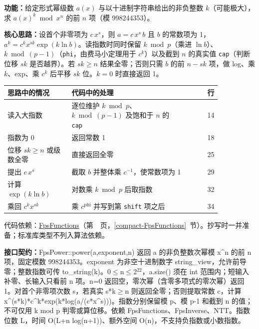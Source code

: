 \noindent\textbf{功能：}\allowbreak 给定形式幂级数 $a(x)$ 与以十进制字符串给出的非负整数 $k$（可能极大），求 $a(x)^k\bmod x^n$ 的前 $n$ 项（模 998244353）。

\textbf{核心思路：}\allowbreak 设首个非零项为 $c\,x^s$，则 $a=c\,x^s\,b$ 且 $b$ 的常数项为 1，$a^k=c^kx^{sk}\exp(k\ln b)$。读指数时同时保留 $k\bmod p$（乘进 $\ln b$）、$k\bmod(p-1)$（\texttt{phi}，由费马小定理用于 $c^k$）以及截到 $n$ 的真实值 \texttt{cap}（判断位移 $sk$ 是否越界）。若 $sk\ge n$ 结果全零；否则只需 $b$ 的前 $n-sk$ 项，做 log、乘 $k$、exp、乘 $c^k$ 后平移 $sk$ 位。$k=0$ 时直接返回 1。

\begin{center}\small
\begin{tabular}{@{}p{0.30\linewidth}p{0.55\linewidth}r@{}}
\toprule
思路中的情况 & 代码中的处理 & 行\\
\midrule
读入大指数 & 逐位维护 $k\bmod p$、$k\bmod(p-1)$ 及饱和于 $n$ 的 \texttt{cap} & 14\\
指数为 0 & 返回常数 1 & 18\\
位移 $sk\ge n$ 或级数全零 & 直接返回全零 & 25\\
提出 $c\,x^s$ & 截取 $b$ 并整体乘 $c^{-1}$，使常数项为 1 & 29\\
计算 $\exp(k\ln b)$ & 对数乘 $k\bmod p$ 后取指数 & 32\\
乘回 $c^k x^{sk}$ & 乘 $c^{\mathrm{phi}}$ 并写到第 \texttt{shift} 项之后 & 34\\
\bottomrule
\end{tabular}
\end{center}

代码依赖：\hyperref[compact-FpsFunctions]{FpsFunctions}（第~\pageref{compact-FpsFunctions}~页，\ref{compact-FpsFunctions}~节）。抄写时一并准备；标准库类型不列入算法依赖。

{\sloppy{}\noindent\textbf{接口契约：}FpsPower::power(a,exponent,n) 返回 a 的非负整数次幂模 x\textasciicircum{}n 的前 n 项，固定模数 998244353。exponent 为非空十进制数字 string\_view，允许前导零；整数指数可传 to\_string(k)。0$\le$n$\le$2$^{22}$，a.size() 须在 int 范围内；短输入补零、长输入只看前 n 项。n=0 返回空，零次幂（含零多项式的零次幂）返回 1。对首个非零项次数 s，若真实 s*k$\ge$n 则返回全零；否则提取常数 c，计算 x\textasciicircum{}(s*k)*c\textasciicircum{}k*exp(k*log(a/(c*x\textasciicircum{}s)))。指数分别保留模 p、模 p-1 和截到 n 的值；不可仅用 k mod p 判零或算位移。依赖 FpsFunctions、FpsInverse、NTT。指数位数 L，时间 O(L+n log(n+1))、额外空间 O(n)，不支持负指数或小数指数。\par}

